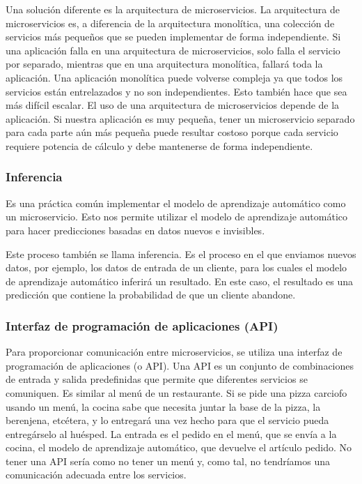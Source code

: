 \documentclass[10pt]{book}
\begin{document}
Una solución diferente es la arquitectura de microservicios. La arquitectura de microservicios es, a diferencia de la arquitectura monolítica, una colección de servicios más pequeños que se pueden implementar de forma independiente. Si una aplicación falla en una arquitectura de microservicios, solo falla el servicio por separado, mientras que en una arquitectura monolítica, fallará toda la aplicación. Una aplicación monolítica puede volverse compleja ya que todos los servicios están entrelazados y no son independientes. Esto también hace que sea más difícil escalar. El uso de una arquitectura de microservicios depende de la aplicación. Si nuestra aplicación es muy pequeña, tener un microservicio separado para cada parte aún más pequeña puede resultar costoso porque cada servicio requiere potencia de cálculo y debe mantenerse de forma independiente.

\subsubsection{Inferencia}
Es una práctica común implementar el modelo de aprendizaje automático como un microservicio. Esto nos permite utilizar el modelo de aprendizaje automático para hacer predicciones basadas en datos nuevos e invisibles.

Este proceso también se llama inferencia. Es el proceso en el que enviamos nuevos datos, por ejemplo, los datos de entrada de un cliente, para los cuales el modelo de aprendizaje automático inferirá un resultado. En este caso, el resultado es una predicción que contiene la probabilidad de que un cliente abandone.

\subsubsection{Interfaz de programación de aplicaciones (API)}
Para proporcionar comunicación entre microservicios, se utiliza una interfaz de programación de aplicaciones (o API). Una API es un conjunto de combinaciones de entrada y salida predefinidas que permite que diferentes servicios se comuniquen. Es similar al menú de un restaurante. Si se pide una pizza carciofo usando un menú, la cocina sabe que necesita juntar la base de la pizza, la berenjena, etcétera, y lo entregará una vez hecho para que el servicio pueda entregárselo al huésped. La entrada es el pedido en el menú, que se envía a la cocina, el modelo de aprendizaje automático, que devuelve el artículo pedido. No tener una API sería como no tener un menú y, como tal, no tendríamos una comunicación adecuada entre los servicios.
\end{document}
